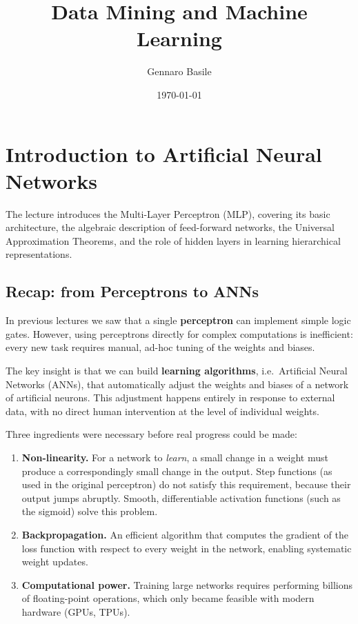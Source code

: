 \documentclass[11pt]{article}
\title{\Huge Data Mining and Machine Learning}
\author{\Large Gennaro Basile}
\date{\today}
\theoremstyle{smallexample}
\begin{document}
\maketitle
{}
\captionsetup[figure]{labelfont=bf}

\pagebreak

\tableofcontents
\pagebreak


\section{Introduction to Artificial Neural Networks}

The lecture introduces the Multi-Layer Perceptron (MLP), covering its basic architecture,
the algebraic description of feed-forward networks, the Universal Approximation Theorems,
and the role of hidden layers in learning hierarchical representations.

\subsection{Recap: from Perceptrons to ANNs}

In previous lectures we saw that a single \textbf{perceptron} can implement simple logic gates.
However, using perceptrons directly for complex computations is inefficient: every new task requires
manual, ad-hoc tuning of the weights and biases.

The key insight is that we can build \textbf{learning algorithms}, i.e.\ Artificial Neural Networks (ANNs),
that automatically adjust the weights and biases of a network of artificial neurons.
This adjustment happens entirely in response to external data, with no direct human intervention at the
level of individual weights.

Three ingredients were necessary before real progress could be made:

\begin{enumerate}
    \item \textbf{Non-linearity.} For a network to \emph{learn}, a small change in a weight must produce a
          correspondingly small change in the output. Step functions (as used in the original perceptron)
          do not satisfy this requirement, because their output jumps abruptly. Smooth, differentiable
          activation functions (such as the sigmoid) solve this problem.
    \item \textbf{Backpropagation.} An efficient algorithm that computes the gradient of the loss function
          with respect to every weight in the network, enabling systematic weight updates.
    \item \textbf{Computational power.} Training large networks requires performing billions of
          floating-point operations, which only became feasible with modern hardware (GPUs, TPUs).
\end{enumerate}
\end{document}
